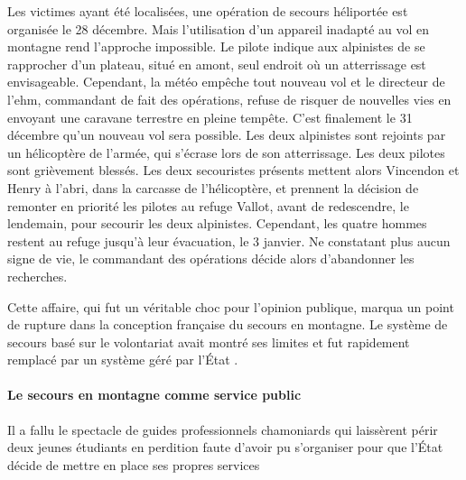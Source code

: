 Les victimes ayant été localisées, une opération de secours héliportée
est organisée le 28 décembre. Mais l'utilisation d'un appareil
inadapté au vol en montagne rend l'approche impossible. Le pilote
indique aux alpinistes de se rapprocher d'un plateau, situé en amont,
seul endroit où un atterrissage est envisageable. Cependant, la météo
empêche tout nouveau vol et le directeur de l'\ac{ehm}, commandant de
fait des opérations, refuse de risquer de nouvelles vies en envoyant
une caravane terrestre en pleine tempête. C'est finalement le 31
décembre qu'un nouveau vol sera possible. Les deux alpinistes sont
rejoints par un hélicoptère de l'armée, qui s'écrase lors de son
atterrissage. Les deux pilotes sont grièvement blessés. Les deux
secouristes présents mettent alors Vincendon et Henry à l'abri, dans
la carcasse de l'hélicoptère, et prennent la décision de remonter en
priorité les pilotes au refuge Vallot, avant de redescendre, le
lendemain, pour secourir les deux alpinistes. Cependant, les quatre
hommes restent au refuge jusqu’à leur évacuation, le 3 janvier. Ne
constatant plus aucun signe de vie, le commandant des opérations
décide alors d'abandonner les recherches.

Cette affaire, qui fut un véritable choc pour l’opinion publique,
marqua un point de rupture dans la conception française du secours en
montagne. Le système de secours basé sur le volontariat avait montré
ses limites et fut rapidement remplacé par un système géré par l'État
\autocite{Ballu1997}.

\paragraph{Le secours en montagne comme service public}
\label{par:1-1-1-1-2}


\begin{displayquote}
  \og Il a fallu le spectacle de guides professionnels chamoniards
  qui laissèrent périr deux jeunes étudiants en perdition faute
  d'avoir pu s'organiser pour que l'État décide de mettre en place ses
  propres services \textelp{}\fg{} \autocite{Descamps2018}
\end{displayquote}

